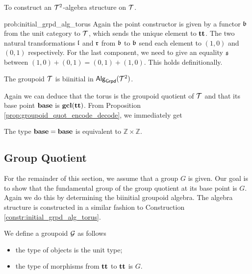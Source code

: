 \begin{problem}
\label{prob:initial_grpd_alg_torus}
To construct an $\mathcal{T}^2$-algebra structure on $\mathcal{T}$.
\end{problem}

\begin{construction}{prob:initial_grpd_alg_torus}
\label{constr:initial_grpd_alg_torus}
Again the point constructor is given by a functor $\mathfrak{b}$ from the unit category to $\mathcal{T}$, which sends the unique element to $\operatorname{\mathbf{tt}}$.
The two natural transformations $\mathfrak{l}$ and $\mathfrak{r}$ from $\mathfrak{b}$ to $\mathfrak{b}$ send each element to $(1, 0)$ and $(0, 1)$ respectively.
For the last component, we need to give an equality $\mathfrak{s}$ between $(1, 0) + (0, 1) = (0, 1) + (1, 0)$.
This holds definitionally.
\end{construction}

\begin{proposition}
The groupoid $\mathcal{T}$ is biinitial in $\mathsf{Alg}_{\mathsf{Grpd}}(\mathcal{T}^2)$.
\end{proposition}

Again we can deduce that the torus is the groupoid quotient of $\mathcal{T}$ and that its base point $\operatorname{\mathbf{base}}$ is $\operatorname{\mathbf{gcl}}(\operatorname{\mathbf{tt}})$.
From Proposition \ref{prop:groupoid_quot_encode_decode}, we immediately get

\begin{corollary}
The type $\operatorname{\mathbf{base}} = \operatorname{\mathbf{base}}$ is equivalent to $\mathbb{Z} \times \mathbb{Z}$.
\end{corollary}

\subsection{Group Quotient}
\label{sec:group_quotient_fund_group}
For the remainder of this section, we assume that a group $G$ is given.
Our goal is to show that the fundamental group of the group quotient at its base point is $G$.
Again we do this by determining the biinitial groupoid algebra.
The algebra structure is constructed in a similar fashion to Construction \ref{constr:initial_grpd_alg_torus}.

\begin{definition}
We define a groupoid $\mathcal{G}$ as follows
\begin{itemize}
	\item the type of objects is the unit type;
	\item the type of morphisms from $\operatorname{\mathbf{tt}}$ to $\operatorname{\mathbf{tt}}$ is $G$.
\end{itemize}
\end{definition}

